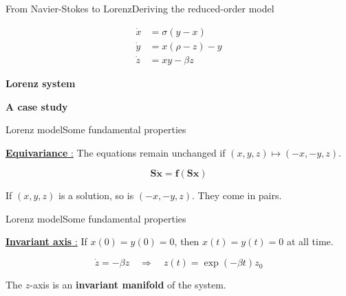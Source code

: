 \documentclass[usenames, dvipsnames, aspectratio=169]{beamer}
\begin{document}
\begin{frame}[t, c]{From Navier-Stokes to Lorenz}{Deriving the reduced-order model}
  \vfill
  \large

  \[
  \begin{aligned}
    \dot{x} & = \sigma \left( y - x \right) \\
    \dot{y} & = x \left( \rho - z \right) - y \\
    \dot{z} & = xy - \beta z
  \end{aligned}
  \]

  \vfill  
\end{frame}

{



  \begin{frame}
    \vfill
    \Large
    \centering

    \textbf{Lorenz system}

    \bigskip

    \large
    \textbf{\color{gray} A case study}

    \vfill
  \end{frame}

}

\begin{frame}[t, c]{Lorenz model}{Some fundamental properties}
  \vfill
  \large

  \underline{\textbf{Equivariance} :} The equations remain unchanged if $(x, y, z) \mapsto (-x, -y, z)$.

  \[
  \bm{S} \dot{\bm{x}} = \bm{f}(\bm{Sx})
  \]

  \bigskip

  If $(x, y, z)$ is a solution, so is $(-x, -y, z)$.
  They come in pairs.

  \vfill
\end{frame}

\begin{frame}[t, c]{Lorenz model}{Some fundamental properties}
  \vfill
  \large

  \underline{\textbf{Invariant axis} :} If $x(0) = y(0) = 0$, then $x(t) = y(t) = 0$ at all time.

  \[
  \dot{z} = - \beta z \quad \Rightarrow \quad z(t) = \exp(-\beta t) z_0
  \]

  \bigskip

  The $z$-axis is an \textbf{\alert{invariant manifold}} of the system.

  \vfill
\end{frame}
\end{document}
